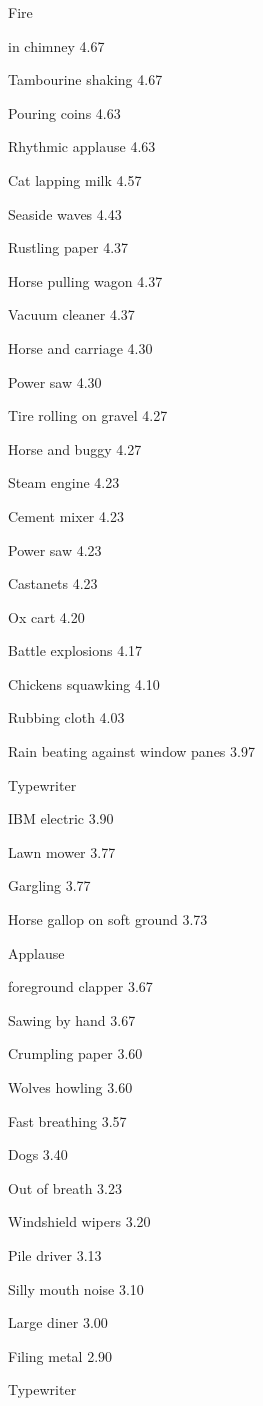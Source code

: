 \documentclass{sig-alternate-05-2015}
\begin{document}
{ Fire 

 in chimney
4.67 

 Tambourine shaking
4.67 

 Pouring coins
4.63 

 Rhythmic applause
4.63 

 Cat lapping milk
4.57 

 Seaside waves
4.43 

 Rustling paper
4.37 

 Horse pulling wagon
4.37 

 Vacuum cleaner
4.37 

 Horse and carriage
4.30 

 Power saw
4.30 

 Tire rolling on gravel
4.27 

 Horse and buggy
4.27 

 Steam engine
4.23 

 Cement mixer
4.23 

 Power saw
4.23 

 Castanets
4.23 

 Ox cart
4.20 

 Battle explosions
4.17 

 Chickens squawking
4.10 

 Rubbing cloth
4.03 

 Rain beating against window panes
3.97 

 Typewriter 

 IBM electric
3.90 

 Lawn mower
3.77 

 Gargling
3.77 

 Horse gallop on soft ground
3.73 

 Applause 

 foreground clapper
3.67 

 Sawing by hand
3.67 

 Crumpling paper
3.60 

 Wolves howling
3.60 

 Fast breathing
3.57 

 Dogs
3.40 

 Out of breath
3.23 

 Windshield wipers
3.20 

 Pile driver
3.13 

 Silly mouth noise
3.10 

 Large diner
3.00 

 Filing metal
2.90 

 Typewriter 

}
\end{document}
